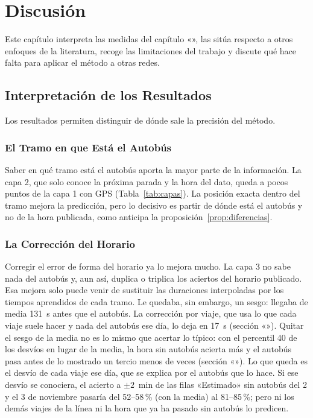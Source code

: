 \chapter{Discusión}
\label{cap:discusion}

Este capítulo interpreta las medidas del capítulo «», las sitúa respecto a otros enfoques de la
literatura, recoge las limitaciones del trabajo y discute qué hace falta para aplicar el método a otras redes.

\section{Interpretación de los Resultados}
\label{sec:interpretacion}

Los resultados permiten distinguir de dónde sale la precisión del método.

\subsection{El Tramo en que Está el Autobús} Saber en qué tramo está el autobús aporta la mayor parte de la información. La capa 2, que solo conoce la
próxima parada y la hora del dato, queda a pocos puntos de la capa 1 con GPS (Tabla~\ref{tab:capas}). La posición
exacta dentro del tramo mejora la predicción, pero lo decisivo es partir de dónde está el autobús y no de la hora
publicada, como anticipa la proposición~\ref{prop:diferencias}.

\subsection{La Corrección del Horario} Corregir el error de forma del horario ya lo mejora mucho. La capa 3 no sabe
nada del autobús y, aun así, duplica o triplica los aciertos del horario publicado. Esa mejora solo puede venir de
sustituir las duraciones interpoladas por los tiempos aprendidos de cada tramo. Le quedaba, sin embargo, un sesgo:
llegaba de media 131~s antes que el autobús. La corrección por viaje, que usa lo que cada viaje suele hacer y nada del
autobús ese día, lo deja en 17~s (sección «»). Quitar el sesgo de la media no es lo mismo
que acertar lo típico: con el percentil 40 de los desvíos en lugar de la media, la hora sin autobús acierta más y el
autobús pasa antes de lo mostrado un tercio menos de veces (sección «»). Lo que
queda es el desvío de cada viaje ese día, que se explica por el autobús que lo hace. Si ese desvío se conociera, el
acierto a $\pm2$~min de las filas «Estimado» sin autobús del 2 y el 3 de noviembre pasaría del 52--58\,\% (con la
media) al 81--85\,\%; pero ni los demás viajes de la línea ni la hora que ya ha pasado sin autobús lo predicen.

